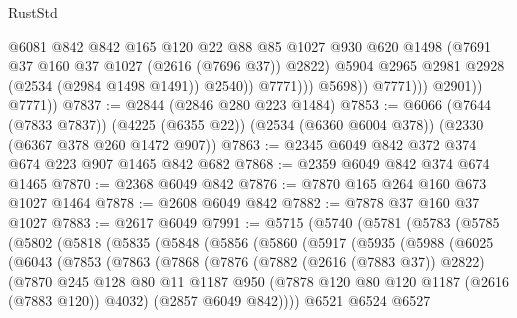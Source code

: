 \begin{lexlean}{RustStd}
\begin{coremodule}
                                @6081
                                @842
                                @842
                                @165
                                @120
                                @22
                                @88
                                @85
                                @1027
                                @930
                                @620
                                @1498
                                (@7691 @37 @160 @37 @1027 (@2616 (@7696 @37)) @2822)
                                @5904
                                @2965
                                @2981
                                @2928
                                (@2534 (@2984 @1498 @1491))
                                @2540))
                            @7771)))
                      @5698))
                  @7771)))
            @2901))
        @7771))
@7837 := @2844 (@2846 @280 @223 @1484)
@7853 := @6066
    (@7644 (@7833 @7837))
    (@4225 (@6355 @22))
    (@2534 (@6360 @6004 @378))
    (@2330 (@6367 @378 @260 @1472 @907))
@7863 := @2345 @6049 @842 @372 @374 @674 @223 @907 @1465 @842 @682
@7868 := @2359 @6049 @842 @374 @674 @1465
@7870 := @2368 @6049 @842
@7876 := @7870 @165 @264 @160 @673 @1027 @1464
@7878 := @2608 @6049 @842
@7882 := @7878 @37 @160 @37 @1027
@7883 := @2617 @6049
@7991 := @5715
    (@5740
      (@5781
        (@5783
          (@5785
            (@5802
              (@5818
                (@5835
                  (@5848
                    (@5856
                      (@5860
                        (@5917
                          (@5935
                            (@5988
                              (@6025
                                (@6043
                                  (@7853
                                    (@7863
                                      (@7868
                                        (@7876
                                          (@7882 (@2616 (@7883 @37)) @2822)
                                          (@7870
                                            @245
                                            @128
                                            @80
                                            @11
                                            @1187
                                            @950
                                            (@7878 @120 @80 @120 @1187 (@2616 (@7883 @120)) @4032)
                                            (@2857 @6049 @842))))
                                      @6521
                                      @6524
                                      @6527

\end{coremodule}
\end{lexlean}
